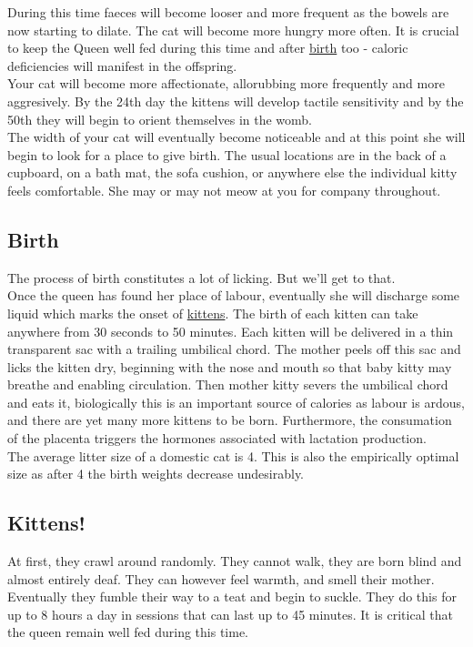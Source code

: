 \documentclass{article}
\begin{document}
During this time faeces will become looser and more frequent as the bowels are now starting to dilate. The cat will become more hungry more often. It is crucial to keep the Queen well fed during this time and after \hyperref[sec:Birth]{birth} too - caloric deficiencies will manifest in the offspring.\\

Your cat will become more affectionate, allorubbing more frequently and more aggresively. By the 24th day the kittens will develop tactile sensitivity and by the 50th they will begin to orient themselves in the womb.\\

The width of your cat will eventually become noticeable and at this point she will begin to look for a place to give birth. The usual locations are in the back of a cupboard, on a bath mat, the sofa cushion, or anywhere else the individual kitty feels comfortable. She may or may not meow at you for company throughout.

\subsection*{Birth}
\label{sec:Birth}
The process of birth constitutes a lot of licking. But we'll get to that.\\

\noindent{}Once the queen has found her place of labour, eventually she will discharge some liquid which marks the onset of \hyperref[sec:Kittens]{kittens}. The birth of each kitten can take anywhere from 30 seconds to 50 minutes. Each kitten will be delivered in a thin transparent sac with a trailing umbilical chord. The mother peels off this sac and licks the kitten dry, beginning with the nose and mouth so that baby kitty may breathe and enabling circulation. Then mother kitty severs the umbilical chord and eats it, biologically this is an important source of calories as labour is ardous, and there are yet many more kittens to be born. Furthermore, the consumation of the placenta triggers the hormones associated with lactation production.\\

The average litter size of a domestic cat is 4. This is also the empirically optimal size as after 4 the birth weights decrease undesirably.

\subsection*{Kittens!}
\label{sec:Kittens}
At first, they crawl around randomly. They cannot walk, they are born blind and almost entirely deaf. They can however feel warmth, and smell their mother. Eventually they fumble their way to a teat and begin to suckle. They do this for up to 8 hours a day in sessions that can last up to 45 minutes. It is critical that the queen remain well fed during this time.
\end{document}
